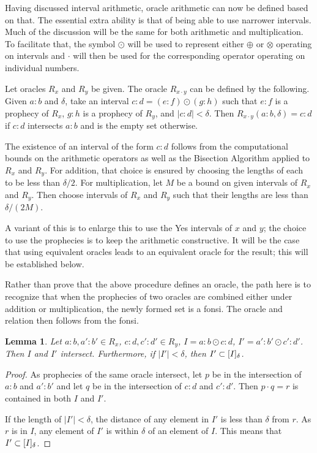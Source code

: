 \documentclass[12pt]{article}
\newtheorem{lemma}{Lemma}[section]
\begin{document}
Having discussed interval arithmetic, oracle arithmetic can now be defined based on that. The essential extra ability is that of being able to use narrower intervals. Much of the discussion will be the same for both arithmetic and multiplication. To facilitate that, the symbol $\odot$ will be used to represent either $\oplus$ or $\otimes$ operating on intervals and $\cdot$ will then be used for the corresponding operator operating on individual numbers.

Let oracles $R_x$ and $R_y$ be given. The oracle $R_{x \cdot y}$ can be defined by the following. Given $a:b$ and $\delta$, take an interval $c:d = (e:f) \odot (g:h)$ such that $e:f$ is a prophecy of $R_x$, $g:h$ is a prophecy of $R_y$, and $|c:d| < \delta$. Then $R_{x \cdot y}(a:b, \delta) = c:d$ if $c:d$ intersects $a:b$ and is the empty set otherwise. 

The existence of an interval of the form $c:d$ follows from the computational bounds on the arithmetic operators as well as the Bisection Algorithm applied to $R_x$ and $R_y$. For addition, that choice is ensured by choosing the lengths of each to be less than $\delta/2$. For multiplication, let $M$ be a bound on given intervals of $R_x$ and $R_y$. Then choose intervals of $R_x$ and $R_y$ such that their lengths are less than $\delta/(2M)$. 

A variant of this is to enlarge this to use the Yes intervals of $x$ and $y$; the choice to use the prophecies is to keep the arithmetic constructive. It will be the case that using equivalent oracles leads to an equivalent oracle for the result; this will be established below. 

Rather than prove that the above procedure defines an oracle, the path here is to recognize that when the prophecies of two oracles are combined either under addition or multiplication, the newly formed set is a fonsi. The oracle and relation then follows from the fonsi. 

\begin{lemma}
    Let $a:b, a':b' \in R_{x}$, $c:d, c':d' \in R_y$, $I =  a:b \odot c:d$, $I' =  a':b' \odot c':d'$. Then $I$ and $I'$ intersect. Furthermore, if $|I'| < \delta$, then $I' \subset [I]_{\delta}$.
\end{lemma}

\begin{proof}   
    As prophecies of the same oracle intersect, let $p$ be in the intersection of $a:b$ and $a':b'$ and let $q$ be in the intersection of $c:d$ and $c':d'$. Then $p \cdot q = r$ is contained in both $I$ and $I'$. 
    
    If the length of $|I'| < \delta$, the distance of any element in $I'$ is less than $\delta$ from $r$. As $r$ is in $I$, any element of $I'$ is within $\delta$ of an element of $I$. This means that $I' \subset [I]_{\delta}$.
\end{proof}
\end{document}
